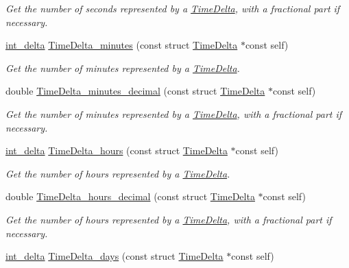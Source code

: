 \begin{DoxyCompactItemize}
\begin{DoxyCompactList}\small\item\em Get the number of seconds represented by a \hyperlink{structTimeDelta}{Time\-Delta}, with a fractional part if necessary. \end{DoxyCompactList}\item 
\hyperlink{types_8h_a8a67cf99971c5cfeeaa2380ba84a4c92}{int\-\_\-delta} \hyperlink{time-delta_8h_a561b203a50b7386cd1076e05f98eb488}{Time\-Delta\-\_\-minutes} (const struct \hyperlink{structTimeDelta}{Time\-Delta} $\ast$const self)
\begin{DoxyCompactList}\small\item\em Get the number of minutes represented by a \hyperlink{structTimeDelta}{Time\-Delta}. \end{DoxyCompactList}\item 
double \hyperlink{time-delta_8h_ae77d3ff682af80dff0e2d601143c4bd7}{Time\-Delta\-\_\-minutes\-\_\-decimal} (const struct \hyperlink{structTimeDelta}{Time\-Delta} $\ast$const self)
\begin{DoxyCompactList}\small\item\em Get the number of minutes represented by a \hyperlink{structTimeDelta}{Time\-Delta}, with a fractional part if necessary. \end{DoxyCompactList}\item 
\hyperlink{types_8h_a8a67cf99971c5cfeeaa2380ba84a4c92}{int\-\_\-delta} \hyperlink{time-delta_8h_aaf78ae5ac19ba90ef26ff6cfc89ea734}{Time\-Delta\-\_\-hours} (const struct \hyperlink{structTimeDelta}{Time\-Delta} $\ast$const self)
\begin{DoxyCompactList}\small\item\em Get the number of hours represented by a \hyperlink{structTimeDelta}{Time\-Delta}. \end{DoxyCompactList}\item 
double \hyperlink{time-delta_8h_ab3eac32bcfa848e984b2d3d2fb48f2f3}{Time\-Delta\-\_\-hours\-\_\-decimal} (const struct \hyperlink{structTimeDelta}{Time\-Delta} $\ast$const self)
\begin{DoxyCompactList}\small\item\em Get the number of hours represented by a \hyperlink{structTimeDelta}{Time\-Delta}, with a fractional part if necessary. \end{DoxyCompactList}\item 
\hyperlink{types_8h_a8a67cf99971c5cfeeaa2380ba84a4c92}{int\-\_\-delta} \hyperlink{time-delta_8h_ae7e2ca9c2f8ce05faf4ba2a207d0e8dd}{Time\-Delta\-\_\-days} (const struct \hyperlink{structTimeDelta}{Time\-Delta} $\ast$const self)

\end{DoxyCompactItemize}
